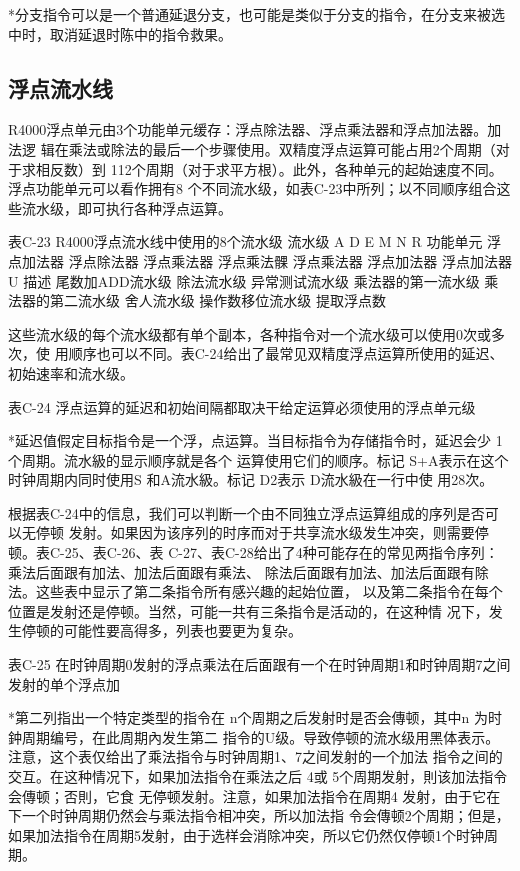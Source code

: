 *分支指令可以是一个普通延退分支，也可能是类似于分支的指令，在分支来被选中时，取消延退时陈中的指令救果。

\subsection{浮点流水线}

R4000浮点单元由3个功能单元缓存：浮点除法器、浮点乘法器和浮点加法器。加法逻
辑在乘法或除法的最后一个步骤使用。双精度浮点运算可能占用2个周期（对于求相反数）到
112个周期（对于求平方根）。此外，各种单元的起始速度不同。浮点功能单元可以看作拥有8
个不同流水级，如表C-23中所列；以不同顺序组合这些流水级，即可执行各种浮点运算。

表C-23 R4000浮点流水线中使用的8个流水级
流水级
A
D
E
M
N
R
功能单元
浮点加法器
浮点除法器
浮点乘法器
浮点乘法髁
浮点乘法器
浮点加法器
浮点加法器
U
描述
尾数加ADD流水级
除法流水级
异常测试流水级
乘法器的第一流水级
乘法器的第二流水级
舍人流水级
操作数移位流水级
提取浮点数

这些流水级的每个流水级都有单个副本，各种指令对一个流水级可以使用0次或多次，使
用顺序也可以不同。表C-24给出了最常见双精度浮点运算所使用的延迟、初始速率和流水级。

表C-24 浮点运算的延迟和初始间隔都取决干给定运算必须使用的浮点单元级

*延迟值假定目标指令是一个浮，点运算。当目标指令为存储指令时，延迟会少 1个周期。流水級的显示顺序就是各个
运算使用它们的顺序。标记 S+A表示在这个时钟周期内同时使用S 和A流水級。标记 D2表示 D流水級在一行中使
用28次。

根据表C-24中的信息，我们可以判断一个由不同独立浮点运算组成的序列是否可以无停顿
发射。如果因为该序列的时序而对于共享流水级发生冲突，则需要停顿。表C-25、表C-26、表
C-27、表C-28给出了4种可能存在的常见两指令序列：乘法后面跟有加法、加法后面跟有乘法、
除法后面跟有加法、加法后面跟有除法。这些表中显示了第二条指令所有感兴趣的起始位置，
以及第二条指令在每个位置是发射还是停顿。当然，可能一共有三条指令是活动的，在这种情
况下，发生停顿的可能性要高得多，列表也要更为复杂。

表C-25 在时钟周期0发射的浮点乘法在后面跟有一个在时钟周期1和时钟周期7之间发射的单个浮点加

*第二列指出一个特定类型的指令在 n个周期之后发射时是否会傳顿，其中n 为时鈡周期编号，在此周期內发生第二
指令的U级。导致停顿的流水级用黑体表示。注意，这个表仅给出了乘法指令与时钟周期1、7之间发射的一个加法
指令之间的交互。在这种情况下，如果加法指令在乘法之后 4或 5个周期发射，則该加法指令会傳顿；否則，它食
无停顿发射。注意，如果加法指令在周期4 发射，由于它在下一个时钟周期仍然会与乘法指令相冲突，所以加法指
令会傳顿2个周期；但是，如果加法指令在周期5发射，由于选样会消除冲突，所以它仍然仅停顿1个时钟周期。

